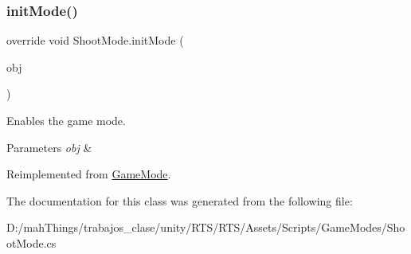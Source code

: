 \mbox{\label{class_shoot_mode_ac89bf282dbd0cb303ca249b6e45b3507}} 
\subsubsection{\texorpdfstring{init\+Mode()}{initMode()}}
{\footnotesize\ttfamily override void Shoot\+Mode.\+init\+Mode (\begin{DoxyParamCaption}\item[{\mbox{\hyperlink{class_selectable_object}{Selectable\+Object}}}]{obj }\end{DoxyParamCaption})\hspace{0.3cm}{\ttfamily [virtual]}}



Enables the game mode. 


\begin{DoxyParams}{Parameters}
{\em obj} & \\
\hline
\end{DoxyParams}


Reimplemented from \mbox{\hyperlink{class_game_mode_ac6701d024e8ab5bf8a8876618a6fd01f}{Game\+Mode}}.



The documentation for this class was generated from the following file\+:\begin{DoxyCompactItemize}
\item 
D\+:/mah\+Things/trabajos\+\_\+clase/unity/\+R\+T\+S/\+R\+T\+S/\+Assets/\+Scripts/\+Game\+Modes/Shoot\+Mode.\+cs\end{DoxyCompactItemize}
